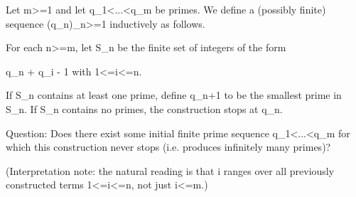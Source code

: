 Let m>=1 and let q_1<...<q_m be primes. We define a (possibly finite) sequence (q_n)_{n>=1} inductively as follows.

For each n>=m, let S_n be the finite set of integers of the form

    q_n + q_i - 1  with  1<=i<=n.

If S_n contains at least one prime, define q_{n+1} to be the smallest prime in S_n. If S_n contains no primes, the construction stops at q_n.

Question: Does there exist some initial finite prime sequence q_1<...<q_m for which this construction never stops (i.e. produces infinitely many primes)?

(Interpretation note: the natural reading is that i ranges over all previously constructed terms 1<=i<=n, not just i<=m.)
